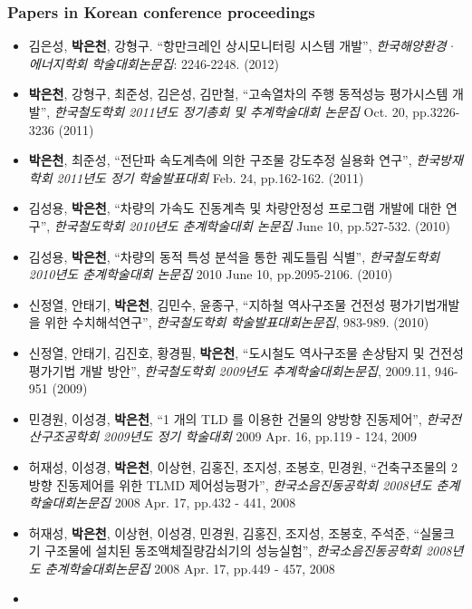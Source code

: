 \subsubsection*{Papers in Korean conference proceedings}
\begin{itemize}
\item
  김은성, \textbf{박은천}, 강형구. ``항만크레인 상시모니터링 시스템 개발'', \emph{한국해양환경· 에너지학회 학술대회논문집}: 2246-2248. (2012)
\item
  \textbf{박은천}, 강형구, 최준성, 김은성, 김만철, ``고속열차의 주행
  동적성능 평가시스템 개발'', \emph{한국철도학회 2011년도 정기총회 및
  추계학술대회 논문집} Oct. 20, pp.3226-3236 (2011)
\item
  \textbf{박은천}, 최준성, ``전단파 속도계측에 의한 구조물 강도추정
  실용화 연구'', \emph{한국방재학회 2011년도 정기 학술발표대회} Feb. 24,
  pp.162-162. (2011)
\item
  김성용, \textbf{박은천}, ``차량의 가속도 진동계측 및 차량안정성
  프로그램 개발에 대한 연구'', \emph{한국철도학회 2010년도 춘계학술대회
  논문집} June 10, pp.527-532. (2010)
\item
  김성용, \textbf{박은천}, ``차량의 동적 특성 분석을 통한 궤도틀림
  식별'', \emph{한국철도학회 2010년도 춘계학술대회 논문집} 2010 June 10,
  pp.2095-2106. (2010)
\item
 신정열, 안태기, \textbf{박은천}, 김민수, 윤종구, ``지하철 역사구조물 건전성 평가기법개발을 위한 수치해석연구'', \emph{한국철도학회 학술발표대회논문집}, 983-989. (2010)
\item
  신정열, 안태기, 김진호, 황경필, \textbf{박은천}, ``도시철도 역사구조물 손상탐지 및 건전성 평가기법 개발 방안'', \emph{한국철도학회 2009년도 추계학술대회논문집}, 2009.11, 946-951 (2009)
\item
  민경원, 이성경, \textbf{박은천}, ``1 개의 TLD 를 이용한 건물의 양방향
  진동제어'', \emph{한국전산구조공학회 2009년도 정기 학술대회} 2009 Apr.
  16, pp.119 - 124, 2009
\item
  허재성, 이성경, \textbf{박은천}, 이상현, 김홍진, 조지성, 조봉호,
  민경원, ``건축구조물의 2방향 진동제어를 위한 TLMD 제어성능평가'',
  \emph{한국소음진동공학회 2008년도 춘계학술대회논문집} 2008 Apr. 17,
  pp.432 - 441, 2008
\item
  허재성, \textbf{박은천}, 이상현, 이성경, 민경원, 김홍진, 조지성,
  조봉호, 주석준, ``실물크기 구조물에 설치된 동조액체질량감쇠기의
  성능실험'', \emph{한국소음진동공학회 2008년도 춘계학술대회논문집} 2008
  Apr. 17, pp.449 - 457, 2008
\item

\end{itemize}
